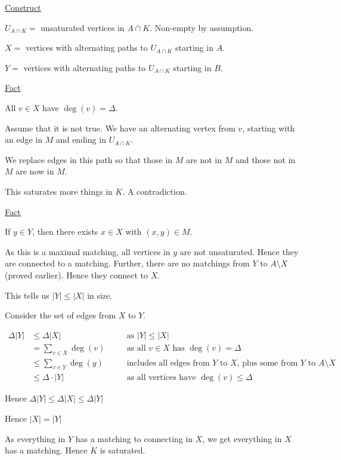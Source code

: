 \documentclass{article}
\begin{document}
\underline{Construct}

$U_{A \cap K} = $ unsaturated vertices in $A \cap K$. Non-empty by assumption. 

$X =$ vertices with alternating paths to $U_{A \cap K}$ starting in $A$.

$Y = $ vertices with alternating paths to $U_{A \cap K}$ starting in $B$. 

\underline{Fact}

All $v \in X$ have $\deg(v) = \Delta$. 

Assume that it is not true. We have an alternating vertex from $v$, starting with an edge in $M$ and ending in $U_{A \cap K}$. 

\begin{center}
\end{center}

We replace edges in this path so that those in $M$ are not in $M$ and those not in $M$ are now in $M$. 

This saturates more things in $K$. A contradiction. 

\underline{Fact}

If $y \in Y$, then there exists $x \in X$ with $(x, y) \in M$. 

As this is a maximal matching, all vertices in $y$ are not unsaturated. Hence they are connected to a matching. Further, there are no matchings from $Y$ to $A \setminus X$ (proved earlier). Hence they connect to $X$. 

This tells us $|Y| \le |X|$ in size. 

Consider the set of edges from $X$ to $Y$. 

\begin{align*}
    \Delta |Y| &\le \Delta |X| &\quad &\text{as $|Y| \le |X|$}\\
    &= \sum_{v \in X} \deg(v)  &\quad &\text{as all $v \in X$ has $\deg(v) = \Delta $} \\
    &\le \sum_{v \in Y} \deg(y) &\quad &\text{includes all edges from $Y$ to $X$, plus some from $Y$ to $A \setminus X$}\\
&\le \Delta \cdot |Y| &\quad &\text{as all vertices have $\deg(v) \le \Delta$}
\end{align*}

Hence $\Delta|Y| \le \Delta|X| \le \Delta |Y|$

Hence $|X| = |Y|$

As everything in $Y$ has a matching to connecting in $X$, we get everything in $X$ has a matching. Hence $K$ is saturated.
\end{document}

